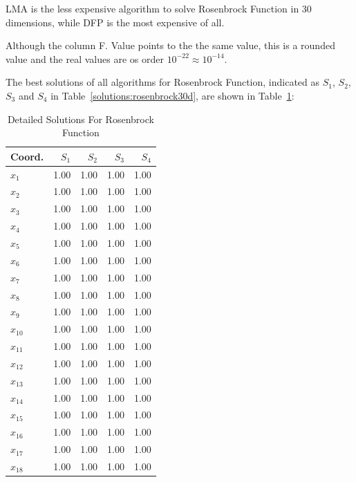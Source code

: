\documentclass[conference]{IEEEtran}
\begin{document}
LMA is the less expensive algorithm to solve Rosenbrock Function in 30 dimensions, while DFP
is the most expensive of all.

Although the column F. Value points to the the same value, this is a rounded value
and the real values are os order $10^{-22} \approx 10^{-14}$.

The best solutions of all algorithms for Rosenbrock Function, indicated as
$S_{1}$, $S_{2}$, $S_{3}$ and $S_{4}$ in Table~\ref{solutions:rosenbrock30d}, are shown
in Table~\ref{detailedsolutions:rosenbrock30d}:

\begin{table}[H]
\centering
\caption{Detailed Solutions For Rosenbrock Function}
\label{detailedsolutions:rosenbrock30d}
\begin{tabular}{lrrrr}
\toprule
  Coord. &  $S_{1}$ &  $S_{2}$ &  $S_{3}$ &  $S_{4}$ \\
\midrule
 $x_{1}$ &     1.00 &     1.00 &     1.00 &     1.00 \\
 $x_{2}$ &     1.00 &     1.00 &     1.00 &     1.00 \\
 $x_{3}$ &     1.00 &     1.00 &     1.00 &     1.00 \\
 $x_{4}$ &     1.00 &     1.00 &     1.00 &     1.00 \\
 $x_{5}$ &     1.00 &     1.00 &     1.00 &     1.00 \\
 $x_{6}$ &     1.00 &     1.00 &     1.00 &     1.00 \\
 $x_{7}$ &     1.00 &     1.00 &     1.00 &     1.00 \\
 $x_{8}$ &     1.00 &     1.00 &     1.00 &     1.00 \\
 $x_{9}$ &     1.00 &     1.00 &     1.00 &     1.00 \\
$x_{10}$ &     1.00 &     1.00 &     1.00 &     1.00 \\
$x_{11}$ &     1.00 &     1.00 &     1.00 &     1.00 \\
$x_{12}$ &     1.00 &     1.00 &     1.00 &     1.00 \\
$x_{13}$ &     1.00 &     1.00 &     1.00 &     1.00 \\
$x_{14}$ &     1.00 &     1.00 &     1.00 &     1.00 \\
$x_{15}$ &     1.00 &     1.00 &     1.00 &     1.00 \\
$x_{16}$ &     1.00 &     1.00 &     1.00 &     1.00 \\
$x_{17}$ &     1.00 &     1.00 &     1.00 &     1.00 \\
$x_{18}$ &     1.00 &     1.00 &     1.00 &     1.00 \\

\end{tabular}
\end{table}
\end{document}
